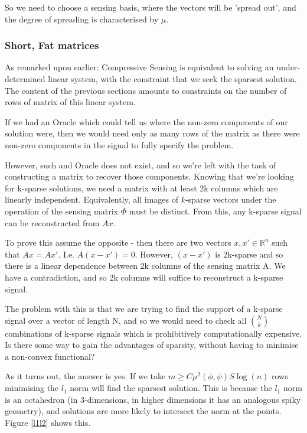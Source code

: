 \documentclass[conference]{IEEEtran}
\begin{document}
So we need to choose a sensing basis, where the vectors will be 'spread out', and the degree of spreading is characterised by \(\mu\).

\subsubsection{Short, Fat matrices}
As remarked upon earlier: Compressive Sensing is equivalent to solving an under-determined linear system, with the constraint that we seek the sparsest solution. The content of the previous sections amounts to constraints on the number of rows of matrix of this linear system. 

If we had an Oracle which could tell us where the non-zero components of our solution were, then we would need only as many rows of the matrix as there were non-zero components in the signal to fully specify the problem. 


However, such and Oracle does not exist, and so we're left with the task of constructing a matrix to recover those components. Knowing that we're looking for k-sparse solutions, we need a matrix with at least 2k columns which are linearly independent. Equivalently, all images of \(k\)-sparse vectors under the operation of the sensing matrix \(\Phi\) must be distinct. From this, any k-sparse signal can be reconstructed from \(Ax\). 

To prove this assume the opposite - then there are two vectors \(x, x' \in \mathbb{R}^n\) such that \(Ax = Ax'\). I.e. \(A(x-x') = 0\). However, \((x-x')\) is 2k-sparse and so there is a linear dependence between 2k columns of the sensing matrix A. We have a contradiction, and so 2k columns will suffice to reconstruct a k-sparse signal. 

The problem with this is that we are trying to find the support of a k-sparse signal over a vector of length N, and so we would need to check all \(N \choose k\) combinations of k-sparse signals which is prohibitively computationally expensive. Is there some way to gain the advantages of sparsity, without having to minimise a non-convex functional?

As it turns out, the answer is yes. If we take \( m \geq C \mu^2(\phi, \psi) S \log\left(n\right) \) rows minimising the \(l_{1}\) norm will find the sparsest solution. This is because the \(l_1\) norm is an octahedron (in 3-dimensions, in higher dimensions it has an analogous spiky geometry), and solutions are more likely to intersect the norm at the points. Figure \ref{l1l2} shows this.
\end{document}
